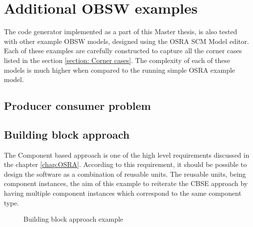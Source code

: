 $  $%
\chapter{Additional OBSW examples}
\label{chap: Extra examples}

The code generator implemented as a part of this Master thesis, is also tested with other example OBSW models, designed using the OSRA SCM Model editor. Each of these examples are carefully constructed to capture all the corner cases listed in the section \cref{section: Corner cases}. The complexity of each of these models is much higher when compared to the running simple OSRA example model.

\section{Producer consumer problem}


\section{Building block approach}
The Component based approach is one of the high level requirements discussed in the chapter \cref{chap:OSRA}. According to this requirement, it should be possible to design the software as a combination of reusable units. The reusable units, being component instances, the aim of this example to reiterate the CBSE approach by having multiple component instances which correspond to the same component type.

\begin{figure}[h]
	\centering
	\hfill
	\hfill
	\caption{Building block approach example}
\end{figure}

